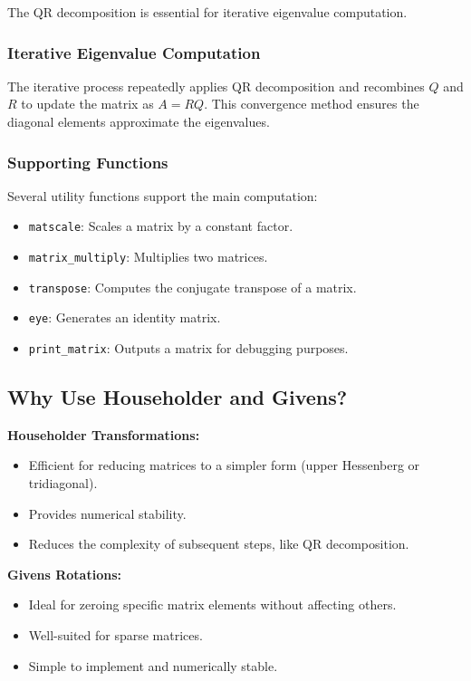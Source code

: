 \documentclass[12pt]{article}
\begin{document}
The QR decomposition is essential for iterative eigenvalue computation.

\subsubsection{Iterative Eigenvalue Computation}

The iterative process repeatedly applies QR decomposition and recombines \( Q \) and \( R \) to update the matrix as \( A = RQ \). This convergence method ensures the diagonal elements approximate the eigenvalues. 

\subsubsection{Supporting Functions}

Several utility functions support the main computation:
\begin{itemize}
    \item \texttt{matscale}: Scales a matrix by a constant factor.
    \item \texttt{matrix\_multiply}: Multiplies two matrices.
    \item \texttt{transpose}: Computes the conjugate transpose of a matrix.
    \item \texttt{eye}: Generates an identity matrix.
    \item \texttt{print\_matrix}: Outputs a matrix for debugging purposes.
\end{itemize}

\subsection{Why Use Householder and Givens?}

\textbf{Householder Transformations:}
\begin{itemize}
    \item Efficient for reducing matrices to a simpler form (upper Hessenberg or tridiagonal).
    \item Provides numerical stability.
    \item Reduces the complexity of subsequent steps, like QR decomposition.
\end{itemize}

\textbf{Givens Rotations:}
\begin{itemize}
    \item Ideal for zeroing specific matrix elements without affecting others.
    \item Well-suited for sparse matrices.
    \item Simple to implement and numerically stable.
\end{itemize}
\end{document}
